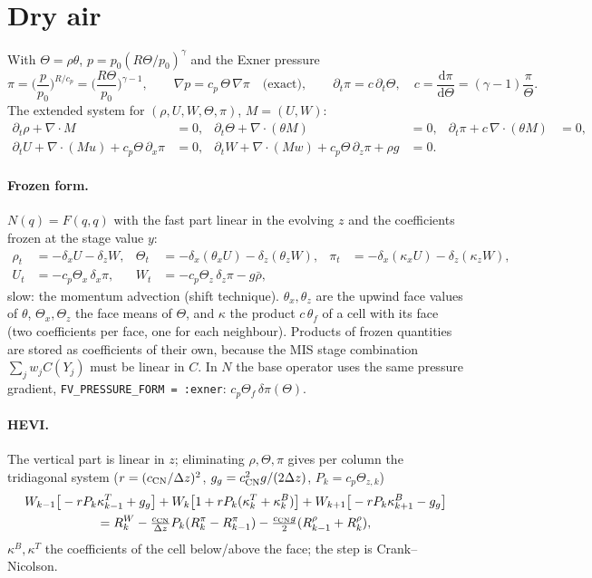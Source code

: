 \documentclass[11pt,a4paper]{article}
\newcommand{\code}[1]{\texttt{#1}}
\begin{document}
\section{Dry air}
With $\Theta=\rho\theta$, $p=p_0(R\Theta/p_0)^{\gamma}$ and the Exner pressure
\[
\pi=\Big(\frac{p}{p_0}\Big)^{R/c_p}=\Big(\frac{R\Theta}{p_0}\Big)^{\gamma-1},\qquad
\nabla p=c_p\,\Theta\,\nabla\pi\quad\text{(exact)},\qquad
\partial_t\pi=c\,\partial_t\Theta,\quad c=\frac{\mathrm d\pi}{\mathrm d\Theta}=(\gamma-1)\frac{\pi}{\Theta}.
\]
The extended system for $(\rho,U,W,\Theta,\pi)$, $M=(U,W)$:
\begin{align*}
\partial_t\rho+\nabla\cdot M&=0, &
\partial_t\Theta+\nabla\cdot(\theta M)&=0, &
\partial_t\pi+c\,\nabla\cdot(\theta M)&=0,\\
\partial_t U+\nabla\cdot(Mu)+c_p\Theta\,\partial_x\pi&=0, &
\partial_t W+\nabla\cdot(Mw)+c_p\Theta\,\partial_z\pi+\rho g&=0.
\end{align*}

\paragraph{Frozen form.} $N(q)=F(q,q)$ with the fast part linear in the evolving $z$ and the
coefficients frozen at the stage value $y$:
\begin{align*}
\rho_t&=-\delta_x U-\delta_z W, &
\Theta_t&=-\delta_x(\theta_x U)-\delta_z(\theta_z W), &
\pi_t&=-\delta_x(\kappa_x U)-\delta_z(\kappa_z W),\\
U_t&=-c_p\Theta_x\,\delta_x\pi, &
W_t&=-c_p\Theta_z\,\delta_z\pi-g\bar\rho, &&
\end{align*}
slow: the momentum advection (shift technique). $\theta_x,\theta_z$ are the upwind face values of
$\theta$, $\Theta_x,\Theta_z$ the face means of $\Theta$, and $\kappa$ the product $c\,\theta_f$ of a cell
with its face (two coefficients per face, one for each neighbour). Products of frozen quantities are
stored as coefficients of their own, because the MIS stage combination $\sum_j w_jC(Y_j)$ must be
linear in $C$. In $N$ the base operator uses the same pressure gradient,
\code{FV\_PRESSURE\_FORM = :exner}: $c_p\Theta_f\,\delta\pi(\Theta)$.

\paragraph{HEVI.} The vertical part is linear in $z$; eliminating $\rho,\Theta,\pi$ gives per column the
tridiagonal system ($r=(c_{\rm CN}/\Delta z)^2$, $g_g=c_{\rm CN}^2g/(2\Delta z)$, $P_k=c_p\Theta_{z,k}$)
\begin{multline*}
W_{k-1}\big[-rP_k\kappa^{T}_{k-1}+g_g\big]+W_k\big[1+rP_k(\kappa^{T}_k+\kappa^{B}_k)\big]+W_{k+1}\big[-rP_k\kappa^{B}_{k+1}-g_g\big]\\
=R^W_k-\tfrac{c_{\rm CN}}{\Delta z}P_k(R^\pi_k-R^\pi_{k-1})-\tfrac{c_{\rm CN}g}{2}(R^\rho_{k-1}+R^\rho_k),
\end{multline*}
$\kappa^B,\kappa^T$ the coefficients of the cell below/above the face; the step is Crank--Nicolson.
\end{document}
